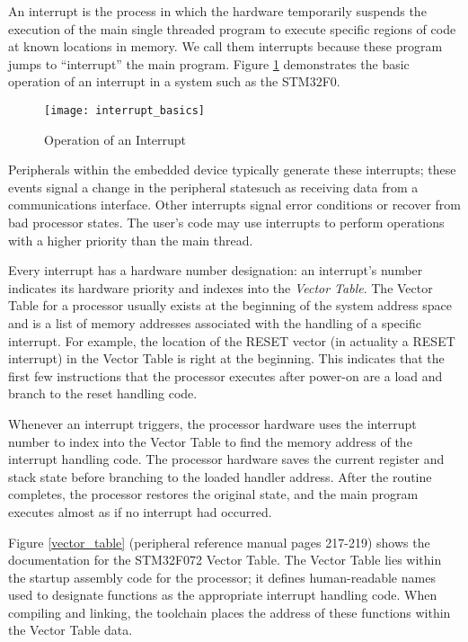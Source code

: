 \documentclass[11pt,fleqn]{book} %
\begin{document}
An interrupt is the process in which the hardware temporarily suspends the execution of the main single threaded program to execute specific regions of code at known locations in memory. We call them interrupts because these program jumps to ``interrupt'' the main program. Figure \ref{interrupt_basics} demonstrates the basic operation of an interrupt in a system such as the STM32F0. 

\begin{figure}[h]
    \centering\texttt{[image: interrupt\_basics]}
    \caption{Operation of an Interrupt}
    \label{interrupt_basics}
\end{figure}

Peripherals within the embedded device typically generate these interrupts; these events signal a change in the peripheral state\textemdash such as receiving data from a communications interface. Other interrupts signal error conditions or recover from bad processor states. The user's code may use interrupts to perform operations with a higher priority than the main thread. 

Every interrupt has a hardware number designation: an interrupt's number indicates its hardware priority and indexes into the \textit{Vector Table}. The Vector Table for a processor usually exists at the beginning of the system address space and is a list of memory addresses associated with the handling of a specific interrupt. For example, the location of the RESET vector (in actuality a RESET interrupt) in the Vector Table is right at the beginning. This indicates that the first few instructions that the processor executes after power-on are a load and branch to the reset handling code. 

Whenever an interrupt triggers, the processor hardware uses the interrupt number to index into the Vector Table to find the memory address of the interrupt handling code. The processor hardware saves the current register and stack state before branching to the loaded handler address. After the routine completes, the processor restores the original state, and the main program executes almost as if no interrupt had occurred. 

Figure \ref{vector_table} (peripheral reference manual pages 217-219) shows the documentation for the STM32F072 Vector Table. The Vector Table lies within the startup assembly code for the processor; it defines human-readable names used to designate functions as the appropriate interrupt handling code. When compiling and linking, the toolchain places the address of these functions within the Vector Table data.  
\end{document}
